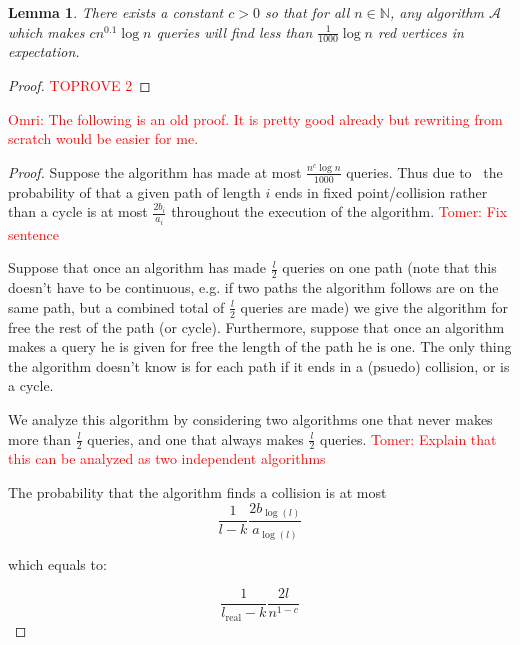 \documentclass[11pt]{article}
\numberwithin{equation}{section}
\newtheorem{lemma}[lemma]{Lemma}
\newcommand{\N}{\mathbb N}
\newcommand{\1}{\mathbf{1}}
\newcommand{\A}{\mathcal A}
\newcommand{\beq}{\begin{equation}}
\newcommand{\eeq}{\end{equation}}
\newcommand\omri[1]{{\textcolor{red}{Omri: #1}}}
\newcommand\tomer[1]{{\textcolor{red}{Tomer: #1}}}
\begin{document}
\begin{lemma}
\label{lem:collision_red_vtxs}
There exists a constant $c > 0$ so that for all $n \in \N$, any algorithm $\A$ which makes $c n^{0.1}\log n$ queries will find less than $\frac{1}{1000}\log n$ red vertices in expectation.
\end{lemma}

\begin{proof}\textcolor{red}{TOPROVE 2}\end{proof}









\iffalse
\omri{The following is an old proof. It is pretty good already but rewriting from scratch would be easier for me.}
\begin{proof}  Suppose the algorithm has made at most $\frac{n^c \log n}{1000}$ queries. Thus due to~ the probability of that a given path of length $i$ ends in fixed point/collision rather than a cycle is at most $\frac{2b_i}{a_i}$ throughout the execution of the algorithm. \tomer{Fix sentence}


Suppose that once an algorithm has made $\frac{l}{2}$ queries on one path (note that this doesn't have to be continuous, e.g. if two paths the algorithm follows are on the same path, but a combined total of $\frac{l}{2}$ queries are made) we give the algorithm for free the rest of the path (or cycle). Furthermore, suppose that once an algorithm makes a query he is given for free the length of the path he is one. The only thing the algorithm doesn't know is for each path if it ends in a (psuedo) collision, or is a cycle.

We analyze this algorithm by considering two algorithms one that never makes more than $\frac{l}{2}$ queries, and one that always makes $\frac{l}{2}$ queries. \tomer{Explain that this can be analyzed as two independent algorithms}



\newcommand{\lreal}{l_{\text{real}}}


The probability that the algorithm finds a collision is at most 
\beq  \label{eq:sucprob}
\frac{1}{l-k} \frac{2b_{\log(l)}}{a_{\log(l)}}
\eeq

which equals to:

\beq
\frac{1}{\lreal-k} \frac{2l}{n^{1-c}}
\eeq






\end{proof}
\end{document}
